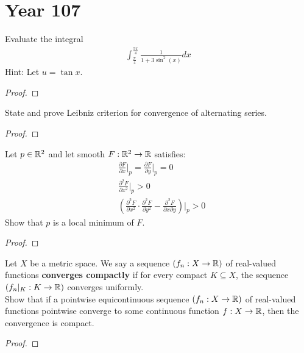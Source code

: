 \documentclass{report}
\begin{document}
\section{Year 107}
\begin{question}{}{}
Evaluate the integral
\begin{align*}
\int^{\frac{5\pi }{4} }_{\frac{\pi }{4}} \frac{1}{1+3 \sin^2(x)}dx
\end{align*}
Hint: Let $u=\tan x$. 
\end{question}
\begin{proof}

\end{proof}
\begin{question}{}{}
State and prove Leibniz criterion for convergence of alternating series. 
\end{question}
\begin{proof}

\end{proof}
\begin{question}{}{}
Let $p \in\mathbb{R}^2$ and let smooth $F:\mathbb{R}^2\rightarrow \mathbb{R}$ satisfies: 
\begin{align*}
  &\frac{\partial F}{\partial x}\Bigg|_p=\frac{\partial F}{\partial y}\Bigg|_p=0\\
  &\frac{\partial^2 F}{\partial x^2}\Bigg|_p>0   \\
  &\left( \frac{\partial^2 F}{\partial x^2} \cdot \frac{\partial ^2 F}{\partial y^2} - \frac{\partial^2 F}{\partial x\partial y}\right) \Bigg|_p >0
\end{align*}
Show that $p$ is a local minimum of  $F$. 
\end{question}
\begin{proof}

\end{proof}
\begin{question}{}{}
Let $X$ be a metric space. We say a  sequence  $(f_n:X\rightarrow \mathbb{R})$ of real-valued functions \textbf{converges compactly} if for every compact $K \subseteq X$, the sequence $(f_n|_K:K\rightarrow \mathbb{R})$ converges uniformly. \\

Show that if a pointwise equicontinuous sequence $(f_n:X\rightarrow \mathbb{R})$ of real-valued functions pointwise converge to some continuous function $f:X\rightarrow \mathbb{R}$, then the convergence is compact.  
\end{question}
\begin{proof}

\end{proof}
\end{document}

